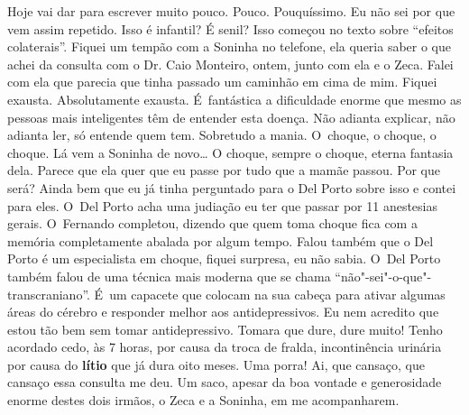 Hoje vai dar para escrever muito pouco. Pouco. Pouquíssimo. Eu não sei
por que vem assim repetido. Isso é infantil? É senil? Isso começou no
texto sobre ``efeitos colaterais''. Fiquei um tempão com a Soninha no
telefone, ela queria saber o que achei da consulta com o Dr. Caio
Monteiro, ontem, junto com ela e o Zeca. Falei com ela que parecia que
tinha passado um caminhão em cima de mim. Fiquei exausta. Absolutamente
exausta. É~fantástica a dificuldade enorme que mesmo as pessoas mais
inteligentes têm de entender esta doença. Não adianta explicar, não
adianta ler, só entende quem tem. Sobretudo a mania. O~choque, o choque,
o choque. Lá vem a Soninha de novo… O choque, sempre o choque,
eterna fantasia dela. Parece que ela quer que eu passe por tudo que a
mamãe passou. Por que será? Ainda bem que eu já tinha perguntado para o
Del Porto sobre isso e contei para eles. O~Del Porto acha uma judiação
eu ter que passar por 11 anestesias gerais. O~Fernando completou,
dizendo que quem toma choque fica com a memória completamente abalada
por algum tempo. Falou também que o Del Porto é um especialista em
choque, fiquei surpresa, eu não sabia. O~Del Porto também falou de uma
técnica mais moderna que se chama ``não"-sei"-o-que"-transcraniano''. É~um
capacete que colocam na sua cabeça para ativar algumas áreas do cérebro
e responder melhor aos antidepressivos. Eu nem acredito que estou tão
bem sem tomar antidepressivo. Tomara que dure, dure muito! Tenho
acordado cedo, às 7 horas, por causa da troca de fralda, incontinência
urinária por causa do \textbf{lítio} que já dura oito meses. Uma porra!
Ai, que cansaço, que cansaço essa consulta me deu. Um saco, apesar da
boa vontade e generosidade enorme destes dois irmãos, o Zeca e a
Soninha, em me acompanharem.

